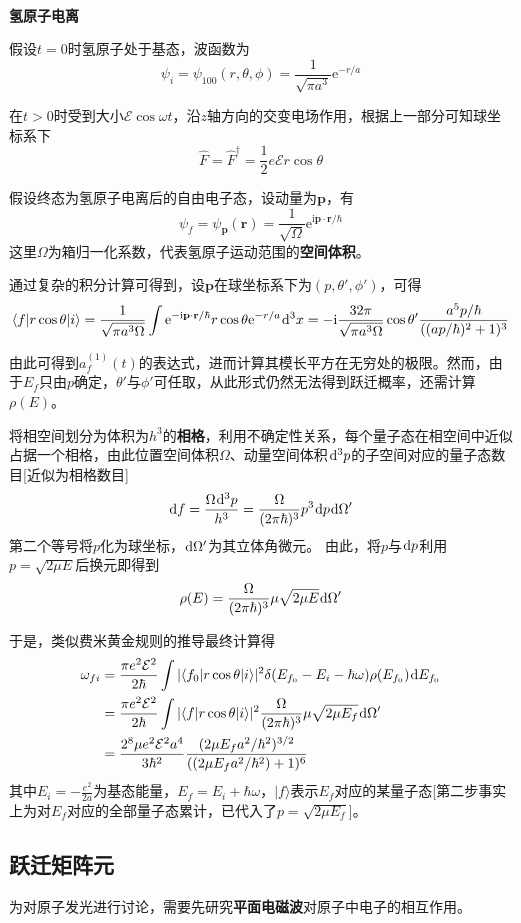 \documentclass[a4paper,UTF8,fontset=windows]{ctexart}
\newcommand*{\dr}{\hspace{0.07em}\mathrm{d}}
\newcommand*{\ir}{\mathrm{i}}
\newcommand*{\er}{\mathrm{e}}
\newcommand*{\ket}[1]{|#1\rangle}
\newcommand*{\blk}[3]{\langle#1|#2|#3\rangle}
\newcommand*{\br}{\mathbf{r}}
\newcommand*{\bp}{\mathbf{p}}
\begin{document}
\

\textbf{氢原子电离}

假设$t=0$时氢原子处于基态，波函数为
$$\psi_i=\psi_{100}(r,\theta,\phi)=\frac{1}{\sqrt{\pi a^3}}\er^{-r/a}$$

在$t>0$时受到大小$\mathcal{E}\cos\omega t$，沿$z$轴方向的交变电场作用，根据上一部分可知球坐标系下
$$\hat{F}=\hat{F}^\dagger=\frac{1}{2}e\mathcal{E}r\cos\theta$$

假设终态为氢原子电离后的自由电子态，设动量为$\bp$，有
$$\psi_f=\psi_\bp(\br)=\frac{1}{\sqrt\Omega}\er^{\ir\bp\cdot\br/\hbar}$$
这里$\Omega$为箱归一化系数，代表氢原子运动范围的\textbf{空间体积}。

通过复杂的积分计算可得到，设$\bp$在球坐标系下为$(p,\theta',\phi')$，可得
$$\blk{f}{r\cos\theta}{i}=\frac{1}{\sqrt{\pi a^3\Omega}}\int\er^{-\ir\bp\cdot\br/\hbar}r\cos\theta\er^{-r/a}\dr^3x=-\ir\frac{32\pi}{\sqrt{\pi a^3\Omega}}\cos\theta'\frac{a^5p/\hbar}{((ap/\hbar)^2+1)^3}$$

由此可得到$a_f^{(1)}(t)$的表达式，进而计算其模长平方在无穷处的极限。然而，由于$E_f$只由$p$确定，$\theta'$与$\phi'$可任取，从此形式仍然无法得到跃迁概率，还需计算$\rho(E)$。

将相空间划分为体积为$h^3$的\textbf{相格}，利用不确定性关系，每个量子态在相空间中近似占据一个相格，由此位置空间体积$\Omega$、动量空间体积$\dr^3p$的子空间对应的量子态数目[近似为相格数目]
$$\dr f=\frac{\Omega\dr^3p}{h^3}=\frac{\Omega}{(2\pi\hbar)^3}p^3\dr p\dr\Omega'$$
第二个等号将$p$化为球坐标，$\dr\Omega'$为其立体角微元。
由此，将$p$与$\dr p$利用$p=\sqrt{2\mu E}$后换元即得到
$$\rho(E)=\frac{\Omega}{(2\pi\hbar)^3}\mu\sqrt{2\mu E}\dr\Omega'$$

于是，类似费米黄金规则的推导最终计算得
$$\begin{aligned}\omega_{fi}&=\frac{\pi e^2\mathcal{E}^2}{2\hbar}\int|\blk{f_0}{r\cos\theta}{i}|^2\delta(E_{f_0}-E_i-\hbar\omega)\rho(E_{f_0})\dr E_{f_0}\\ &=\frac{\pi e^2\mathcal{E}^2}{2\hbar}\int|\blk{f}{r\cos\theta}{i}|^2\frac{\Omega}{(2\pi\hbar)^3}\mu\sqrt{2\mu E_f}\dr\Omega'\\ &=\frac{2^8\mu e^2\mathcal{E}^2a^4}{3\hbar^2}\frac{(2\mu E_fa^2/\hbar^2)^{3/2}}{((2\mu E_fa^2/\hbar^2)+1)^6}\end{aligned}$$
其中$E_i=-\frac{e^2}{2a}$为基态能量，$E_f=E_i+\hbar\omega$，$\ket{f}$表示$E_f$对应的某量子态[第二步事实上为对$E_f$对应的全部量子态累计，已代入了$p=\sqrt{2\mu E_f}$]。

\subsection{跃迁矩阵元}
为对原子发光进行讨论，需要先研究\textbf{平面电磁波}对原子中电子的相互作用。
\end{document}
